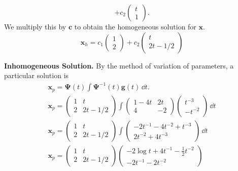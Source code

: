 \begin{Solution}
\[  + c_2 \begin{pmatrix} t \\ 1 \end{pmatrix}.
  \]
  We multiply this by $\mathbf{c}$ to obtain the homogeneous solution for $\mathbf{x}$.
  \[
  \mathbf{x}_h =
  c_1
  \begin{pmatrix}
    1 \\
    2
  \end{pmatrix}  + 
  c_2 
  \begin{pmatrix}
    t \\
    2 t -1/2
  \end{pmatrix} 
  \]



  \textbf{Inhomogeneous Solution.}
  By the method of variation of parameters, a particular solution is
  \begin{gather*}
    \mathbf{x}_p = \boldsymbol{\Psi}(t) \int \boldsymbol{\Psi}^{-1}(t) \mathbf{g}(t) \,\dd t. \\
    \mathbf{x}_p = 
    \begin{pmatrix}
      1 & t \\
      2 & 2 t - 1/2
    \end{pmatrix} 
    \int
    \begin{pmatrix}
      1 -4 t  & 2 t \\
      4 & -2
    \end{pmatrix} 
    \begin{pmatrix}
      t^{-3} \\
      -t^{-2}
    \end{pmatrix} 
    \,\dd t \\
    \mathbf{x}_p = 
    \begin{pmatrix}
      1 & t \\
      2 & 2 t - 1/2
    \end{pmatrix} 
    \int
    \begin{pmatrix}
      -2 t^{-1} -4 t^{-2} + t^{-3} \\
      2 t^{-2} + 4 t^{-3}
    \end{pmatrix} 
    \,\dd t \\
    \mathbf{x}_p = 
    \begin{pmatrix}
      1 & t \\
      2 & 2 t - 1/2
    \end{pmatrix} 
    \begin{pmatrix}
      -2 \log t + 4 t^{-1} - \frac{1}{2} t^{-2} \\
      - 2 t^{-1} - 2 t^{-2}

\end{pmatrix}
\end{gather*}
\end{Solution}
